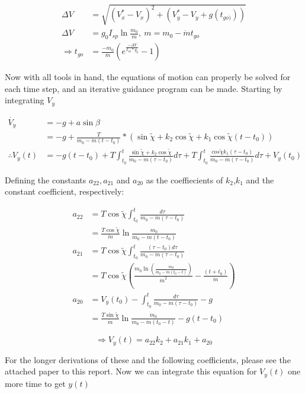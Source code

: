 \documentclass{article}
\begin{document}
\begin{align}
\Delta V &= \sqrt{(V_x^* - V_x)^2 +(V_y^* - V_y +g(t_{go)}))}\\
\Delta V &=g_0 I_{sp}\ln{\frac{m_0}{m}} ,\ m = m_0 - \dot{m}t_{go} \\
\Rightarrow t_{go} &= \frac{-m_0}{\dot{m}} (e^{\frac{-\Delta V}{I_{sp}*g_0}} - 1) 
\end{align}
 
Now with all tools in hand, the equations of motion can properly be solved for each time step, and an iterative guidance program can be made. Starting by integrating $V_y$

\begin{align*}
\dot{V_y}&= -g + a \sin\beta\\
&= -g + \frac{T}{{m_0 - {\dot{m}}(t-t_0)}} *(\sin\tilde\chi + k_2\cos\tilde\chi + k_1\cos\tilde\chi(t - t_0)) \\
\therefore V_y(t) &= -g(t-t_0) + T\int_{t_0}^t\frac{\sin\tilde\chi+k_2\cos\tilde\chi}{m_0 - {\dot{m}}(\tau-t_0)} d\tau + T\int_{t_0}^t\frac{cos\tilde\chi k_1 (\tau - t_0)}{{m_0 - {\dot{m}}(\tau-t_0)}}d\tau +V_y(t_0)
\end{align*}

Defining the constants $a_{22},a_{21}$ and $a_{20}$ as the coeffiecients of $k_2$,$k_1$ and the constant coefficient, respectively:

\begin{align*}
a_{22} &= T\cos{\tilde\chi}\int_{t_0}^t \frac{d\tau}{m_0 - \dot{m}(\tau - t_0)} \\ 
&= \frac{T\cos\tilde\chi}{\dot{m}} \ln\frac{m_0}{m_0 - \dot{m}(t-t_0)} \\
a_{21} &= T\cos{\tilde\chi}\int_{t_0}^t \frac{(\tau - t_0)d\tau}{m_0 - \dot{m}(\tau - t_0)} \\ 
&= T\cos{\tilde\chi} (\frac{m_0\ln({\frac{m_0}{m_0 - \dot{m}(t_0 - t)}})}{\dot{m}^2} - \frac{(t + t_0)}{\dot{m}}) \\
a_{20} &= V_y(t_0) - \int_{t_0}^t \frac{d\tau}{m_0 - \dot{m}(\tau - t_0)} - g\\
 &= \frac{T\sin{\tilde\chi}}{\dot{m}} \ln{\frac{m_0}{m_0 - \dot{m}(t_0 - t)}} - g(t - t_0)
\end{align*}

\begin{equation*}
\Rightarrow V_y(t) = a_{22}k_2 + a_{21}k_1 + a_{20}
\end{equation*}

For the longer derivations of these and the following coefficients, please see the attached paper to this report. 
Now we can integrate this equation for $V_y(t)$ one more time to get $y(t)$
\end{document}

